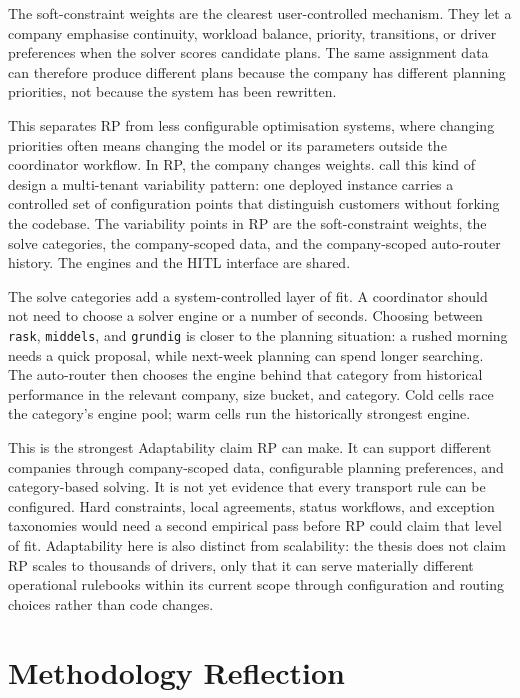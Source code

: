The soft-constraint weights are the clearest user-controlled mechanism. They let a company emphasise continuity, workload balance, priority, transitions, or driver preferences when the solver scores candidate plans. The same assignment data can therefore produce different plans because the company has different planning priorities, not because the system has been rewritten.

This separates RP from less configurable optimisation systems, where changing priorities often means changing the model or its parameters outside the coordinator workflow. In RP, the company changes weights. \textcite{mietzner2009variability} call this kind of design a multi-tenant variability pattern: one deployed instance carries a controlled set of configuration points that distinguish customers without forking the codebase. The variability points in RP are the soft-constraint weights, the solve categories, the company-scoped data, and the company-scoped auto-router history. The engines and the HITL interface are shared.

The solve categories add a system-controlled layer of fit. A coordinator should not need to choose a solver engine or a number of seconds. Choosing between \texttt{rask}, \texttt{middels}, and \texttt{grundig} is closer to the planning situation: a rushed morning needs a quick proposal, while next-week planning can spend longer searching. The auto-router then chooses the engine behind that category from historical performance in the relevant company, size bucket, and category. Cold cells race the category's engine pool; warm cells run the historically strongest engine.

This is the strongest Adaptability claim RP can make. It can support different companies through company-scoped data, configurable planning preferences, and category-based solving. It is not yet evidence that every transport rule can be configured. Hard constraints, local agreements, status workflows, and exception taxonomies would need a second empirical pass before RP could claim that level of fit. Adaptability here is also distinct from scalability: the thesis does not claim RP scales to thousands of drivers, only that it can serve materially different operational rulebooks within its current scope through configuration and routing choices rather than code changes.


\section{Methodology Reflection}
\label{sec:methodology-reflection}

